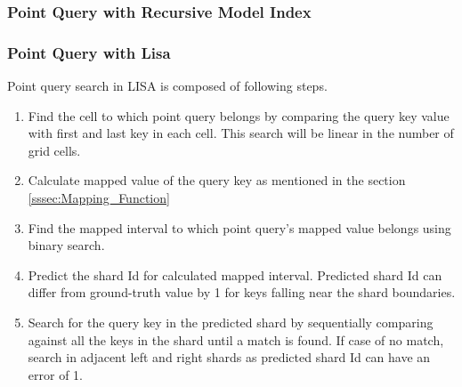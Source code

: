 

\subsubsection{Point Query with Recursive Model Index}



\subsubsection{Point Query with Lisa}
Point query search in LISA is composed of following steps.

\begin{enumerate}
	\item Find the cell to which point query belongs by comparing the query key value with first and last key in each cell. This search will be linear in the number of grid cells.
	\item Calculate mapped value of the query key as mentioned in the section \ref{sssec:Mapping_Function}
	\item Find the mapped interval to which point query's mapped value belongs using binary search. 
	\item Predict the shard Id for calculated mapped interval. Predicted shard Id can differ from ground-truth value by 1 for keys falling near the shard boundaries. 
	\item Search for the query key in the predicted shard by sequentially comparing against all the keys in the shard until a match is found. If case of no match, search in adjacent left and right shards as predicted shard Id can have an error of 1. 
\end{enumerate}
